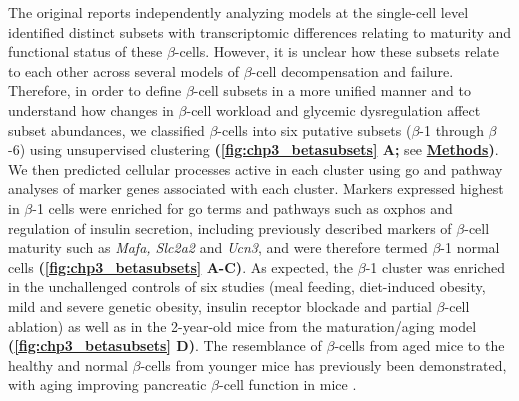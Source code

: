 \par The original reports independently analyzing models at the single-cell level identified distinct subsets with transcriptomic differences relating to maturity and functional status of these $\beta$-cells. However, it is unclear how these subsets relate to each other across several models of $\beta$-cell decompensation and failure. Therefore, in order to define $\beta$-cell subsets in a more unified manner and to understand how changes in $\beta$-cell workload and glycemic dysregulation affect subset abundances, we classified $\beta$-cells into six putative subsets ($\beta$-1 through $\beta$-6) using unsupervised clustering \textbf{(\autoref{fig:chp3_betasubsets} A;} see \hyperref[subsubsec:met_chp3_betareint]{\textbf{Methods}}\textbf{)}. We then predicted cellular processes active in each cluster using \gls{go} and pathway analyses of marker genes associated with each cluster. Markers expressed highest in $\beta$-1 cells were enriched for \gls{go} terms and pathways such as \gls{oxphos} and regulation of insulin secretion, including previously described markers of $\beta$-cell maturity such as \textit{Mafa, Slc2a2}  and \textit{Ucn3}, and were therefore termed $\beta$-1 normal cells \textbf{(\autoref{fig:chp3_betasubsets} A-C)}. As expected, the $\beta$-1 cluster was enriched in the unchallenged controls of six studies (meal feeding, diet-induced obesity, mild and severe genetic obesity, insulin receptor blockade and partial $\beta$-cell ablation) as well as in the 2-year-old mice from the maturation/aging model \textbf{(\autoref{fig:chp3_betasubsets} D)}. The resemblance of $\beta$-cells from aged mice to the healthy and normal $\beta$-cells from younger mice has previously been demonstrated, with aging improving pancreatic $\beta$-cell function in mice \textbf{\cite{xin_single-cell_2016}}.\\ %


